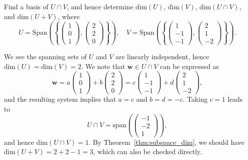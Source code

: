 \documentclass[letter-paper]{tufte-book}
\newenvironment{example}[1][Example]{\begin{trivlist}
\item[\hskip \labelsep {\bfseries #1}]}{\end{trivlist}}
\newcommand{\wb}{{\boldsymbol{w}}}
\begin{document}
\begin{example}
  Find a basis of $U \cap V$, and hence determine $\mbox{dim}(U)$, $\mbox{dim}(V)$, $\mbox{dim}(U \cap V)$, and $\mbox{dim}(U+V)$, where
  \begin{equation*}
    U = \mbox{Span}\left(\left\{\begin{pmatrix}1 \\ 0\\ 1\end{pmatrix}, \begin{pmatrix}2 \\ 2\\ 0\end{pmatrix}\right\}\right), \quad V = \mbox{Span}\left(\left\{\begin{pmatrix}1 \\ -1\\ -1\end{pmatrix}, \begin{pmatrix}2 \\ 1\\ -2\end{pmatrix}\right\}\right).
  \end{equation*}
    
  We see the spanning sets of $U$ and $V$ are linearly independent, hence $\mbox{dim}(U) = \mbox{dim}(V) =2$. We note that $\wb \in U \cap V$ can be expressed as
  \begin{equation*}
    \wb = a \begin{pmatrix}1 \\ 0\\ 1\end{pmatrix} + b \begin{pmatrix}2 \\ 2\\ 0\end{pmatrix} = c \begin{pmatrix}1 \\ -1\\ -1\end{pmatrix} + d \begin{pmatrix}2 \\ 1\\ -2\end{pmatrix},
  \end{equation*}
  and the resulting system implies that $a=c$ and $b=d=-c$. Taking $c=1$ leads to
  \begin{equation*}
    U \cap V = \mbox{span}\left(\begin{pmatrix}-1 \\ -2\\ 1\end{pmatrix}\right),
  \end{equation*}
  and hence $\mbox{dim}(U \cap V) = 1$. By Theorem~\ref{thm:subspace_dim}, we should have $\mbox{dim}(U + V) = 2+2-1 = 3$, which can also be checked directly.
\end{example}
\end{document}
